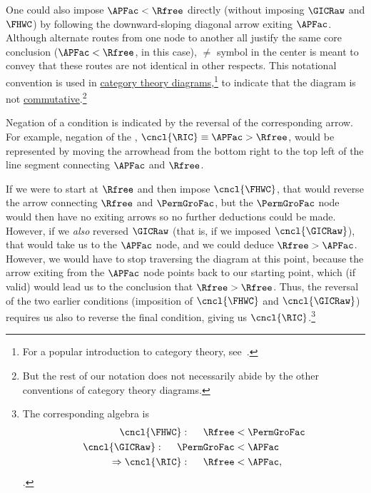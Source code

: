 \documentclass[\econtexRoot/BufferStockTheory]{subfiles}
\begin{document}
One could also impose $\APFac < \Rfree$ directly (without imposing $\GICRaw$ and $\FHWC$) by following the downward-sloping diagonal arrow exiting $\APFac$.  Although alternate routes from one node to another all justify the same core conclusion ($\APFac < \Rfree$, in this case), $\neq$ symbol in the center is meant to convey that these routes are not identical in other respects.  This notational convention is used in \href{https://en.wikipedia.org/wiki/Diagram_(category_theory)}{category theory diagrams},\footnote{For a popular introduction to category theory, see~\cite{riehl2017category}.} to indicate that the diagram is not \href{https://en.wikipedia.org/wiki/Commutative_diagram}{commutative}.\footnote{But the rest of our notation does not necessarily abide by the other conventions of category theory diagrams.}

Negation of a condition is indicated by the reversal of the corresponding arrow.  For example, negation of the {\RIC},  $\cncl{\RIC} \equiv \APFac > \Rfree$, would be represented by moving the arrowhead from the bottom right to the top left of the line segment connecting {$\APFac$} and $\Rfree$.

If we were to start at $\Rfree$ and then impose $\cncl{\FHWC}$, that would reverse the arrow connecting $\Rfree$ and $\PermGroFac$, but the $\PermGroFac$ node would then have no exiting arrows so no further deductions could be made.  However, if we \textit{also} reversed $\GICRaw$ (that is, if we imposed $\cncl{\GICRaw}$), that would take us to the $\APFac$ node, and we could deduce $\Rfree > \APFac$.  However, we would have to stop traversing the diagram at this point, because the arrow exiting from the $\APFac$ node points back to our starting point, which (if valid) would lead us to the conclusion that $\Rfree > \Rfree$.  Thus, the reversal of the two earlier conditions (imposition of $\cncl{\FHWC}$ and $\cncl{\GICRaw}$) requires us also to reverse the final condition, giving us $\cncl{\RIC}$.\footnote{The corresponding algebra is
\begin{equation}\begin{gathered}\begin{aligned}
  \cncl{\FHWC}:~~~~  \Rfree & < \PermGroFac \notag  
  \\ \cncl{\GICRaw}:~~~~ \PermGroFac & < \APFac %
                                \label{eq:cnclRIC}
  \\ \Rightarrow \cncl{\RIC}:~~~~\Rfree & < \APFac \notag,
\end{aligned}\end{gathered}\end{equation}.}
\end{document}
